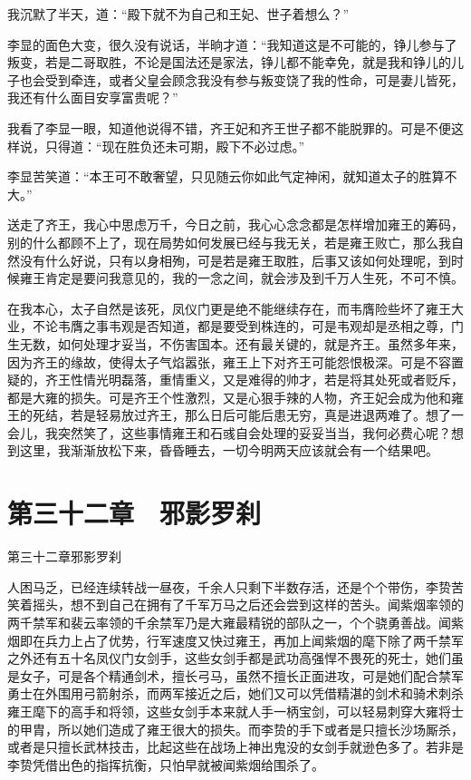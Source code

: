 我沉默了半天，道：“殿下就不为自己和王妃、世子着想么？”

李显的面色大变，很久没有说话，半晌才道：“我知道这是不可能的，铮儿参与了叛变，若是二哥取胜，不论是国法还是家法，铮儿都不能幸免，就是我和铮儿的儿子也会受到牵连，或者父皇会顾念我没有参与叛变饶了我的性命，可是妻儿皆死，我还有什么面目安享富贵呢？”

我看了李显一眼，知道他说得不错，齐王妃和齐王世子都不能脱罪的。可是不便这样说，只得道：“现在胜负还未可期，殿下不必过虑。”

李显苦笑道：“本王可不敢奢望，只见随云你如此气定神闲，就知道太子的胜算不大。”

送走了齐王，我心中思虑万千，今日之前，我心心念念都是怎样增加雍王的筹码，别的什么都顾不上了，现在局势如何发展已经与我无关，若是雍王败亡，那么我自然没有什么好说，只有以身相殉，可是若是雍王取胜，后事又该如何处理呢，到时候雍王肯定是要问我意见的，我的一念之间，就会涉及到千万人生死，不可不慎。

在我本心，太子自然是该死，凤仪门更是绝不能继续存在，而韦膺险些坏了雍王大业，不论韦膺之事韦观是否知道，都是要受到株连的，可是韦观却是丞相之尊，门生无数，如何处理才妥当，不伤害国本。还有最关键的，就是齐王。虽然多年来，因为齐王的缘故，使得太子气焰嚣张，雍王上下对齐王可能怨恨极深。可是不容置疑的，齐王性情光明磊落，重情重义，又是难得的帅才，若是将其处死或者贬斥，都是大雍的损失。可是齐王个性激烈，又是心狠手辣的人物，齐王妃会成为他和雍王的死结，若是轻易放过齐王，那么日后可能后患无穷，真是进退两难了。想了一会儿，我突然笑了，这些事情雍王和石彧自会处理的妥妥当当，我何必费心呢？想到这里，我渐渐放松下来，昏昏睡去，一切今明两天应该就会有一个结果吧。

\chapter{第三十二章　邪影罗刹}

第三十二章邪影罗刹

人困马乏，已经连续转战一昼夜，千余人只剩下半数存活，还是个个带伤，李贽苦笑着摇头，想不到自己在拥有了千军万马之后还会尝到这样的苦头。闻紫烟率领的两千禁军和裴云率领的千余禁军乃是大雍最精锐的部队之一，个个骁勇善战。闻紫烟即在兵力上占了优势，行军速度又快过雍王，再加上闻紫烟的麾下除了两千禁军之外还有五十名凤仪门女剑手，这些女剑手都是武功高强悍不畏死的死士，她们虽是女子，可是各个精通剑术，擅长弓马，虽然不擅长正面进攻，可是她们配合禁军勇士在外围用弓箭射杀，而两军接近之后，她们又可以凭借精湛的剑术和骑术刺杀雍王麾下的高手和将领，这些女剑手本来就人手一柄宝剑，可以轻易刺穿大雍将士的甲胄，所以她们造成了雍王很大的损失。而李贽的手下或者是只擅长沙场厮杀，或者是只擅长武林技击，比起这些在战场上神出鬼没的女剑手就逊色多了。若非是李贽凭借出色的指挥抗衡，只怕早就被闻紫烟给围杀了。

